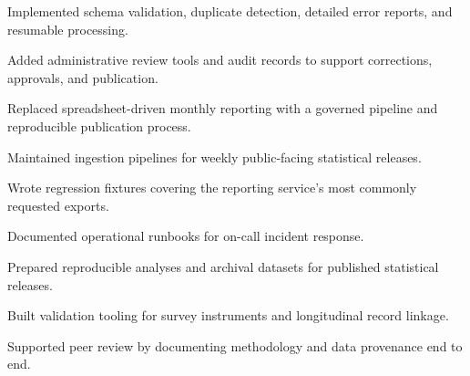 \documentclass[fontsize=11pt, margin=narrow, medium=print]{careerdossier-resume}
\begin{document}
\begin{CDossierEntry}[title = {Analytics Engineer}, organization = {Regional Data Cooperative}, location = {Kitchener, ON}, dates = {2016--2018}]
  \begin{CDossierItemize}
    \item Implemented schema validation, duplicate detection, detailed error reports, and resumable processing.
    \item Added administrative review tools and audit records to support corrections, approvals, and publication.
    \item Replaced spreadsheet-driven monthly reporting with a governed pipeline and reproducible publication process.
  \end{CDossierItemize}
\end{CDossierEntry}
\begin{CDossierEntry}[title = {Junior Analyst}, organization = {Lakeshore Analytics Group}, location = {Hamilton, ON}, dates = {2014--2016}]
  \begin{CDossierItemize}
    \item Maintained ingestion pipelines for weekly public-facing statistical releases.
    \item Wrote regression fixtures covering the reporting service's most commonly requested exports.
    \item Documented operational runbooks for on-call incident response.
  \end{CDossierItemize}
\end{CDossierEntry}
\begin{CDossierEntry}[title = {Research Assistant}, organization = {Institute for Applied Statistics}, location = {Toronto, ON}, dates = {2012--2014}]
  \begin{CDossierItemize}
    \item Prepared reproducible analyses and archival datasets for published statistical releases.
    \item Built validation tooling for survey instruments and longitudinal record linkage.
    \item Supported peer review by documenting methodology and data provenance end to end.
  \end{CDossierItemize}
\end{CDossierEntry}


\begin{CDossierEntry}[title = {Ph.D. in Computer Science}, organization = {University of Toronto}, location = {Toronto, ON}, dates = {2021--2026}]
\end{CDossierEntry}
\begin{CDossierEntry}[title = {M.Sc. in Software Engineering}, organization = {McGill University}, location = {Montréal, QC}, dates = {2019--2021}]
\end{CDossierEntry}
\end{document}
